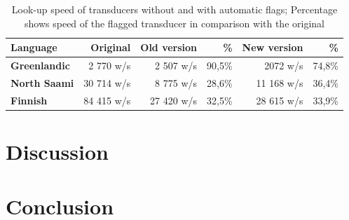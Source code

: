 \documentclass[11pt]{article}
\begin{document}
\begin{table}[h]
 \centering
    \begin{tabular}{|l|r|r|r|r|r|}
        \hline
        \bf Language & \bf Original & \bf Old version & \bf \% & \bf New version & \bf \% \\
        \hline\hline
        \bf Greenlandic & 2 770 w/s & 2 507 w/s & 90,5\% & 2072 w/s & 74,8\%  \\
        \bf North Saami & 30 714 w/s & 8 775 w/s & 28,6\% & 11 168 w/s & 36,4\%  \\
        \bf Finnish  & 84 415 w/s & 27 420 w/s & 32,5\%  & 28 615 w/s & 33,9\%  \\
        \hline
    \end{tabular}
    \caption{Look-up speed of transducers without and with automatic flags; Percentage shows speed of the flagged transducer in comparison with the original
    \label{table:lookup}}
\end{table}





\section{Discussion}
\label{sec:discussion}





\section{Conclusion}
\label{sec:conclusion}

\end{document}
